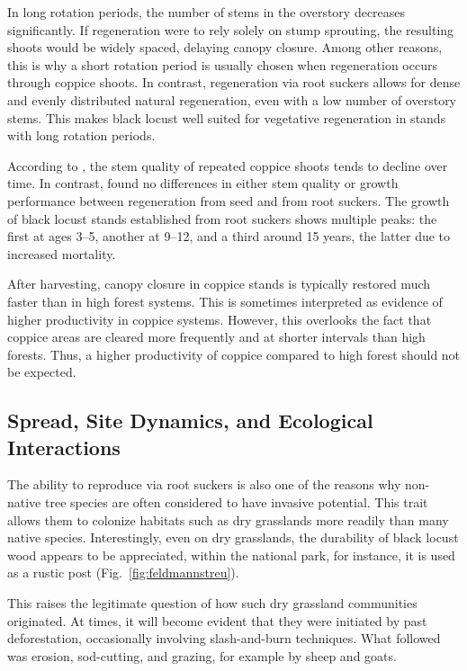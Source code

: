 In long rotation periods, the number of stems in the overstory decreases significantly. If regeneration were to rely solely on stump sprouting, the resulting shoots would be widely spaced, delaying canopy closure. Among other reasons, this is why a short rotation period is usually chosen when regeneration occurs through coppice shoots. In contrast, regeneration via root suckers allows for dense and evenly distributed natural regeneration, even with a low number of overstory stems. This makes black locust well suited for vegetative regeneration in stands with long rotation periods.

According to \citet{iski2019robinie}, the stem quality of repeated coppice shoots tends to decline over time. In contrast, \citet{redei2011robinieWaldbau} found no differences in either stem quality or growth performance between regeneration from seed and from root suckers. The growth of black locust stands established from root suckers shows multiple peaks: the first at ages 3–5, another at 9–12, and a third around 15 years, the latter due to increased mortality.

After harvesting, canopy closure in coppice stands is typically restored much faster than in high forest systems. This is sometimes interpreted as evidence of higher productivity in coppice systems. However, this overlooks the fact that coppice areas are cleared more frequently and at shorter intervals than high forests. Thus, a higher productivity of coppice compared to high forest should not be expected.

\subsection{Spread, Site Dynamics, and Ecological Interactions}

The ability to reproduce via root suckers is also one of the reasons why non-native tree species are often considered to have invasive potential. This trait allows them to colonize habitats such as dry grasslands more readily than many native species. Interestingly, even on dry grasslands, the durability of black locust wood appears to be appreciated, within the national park, for instance, it is used as a rustic post (Fig.~\ref{fig:feldmannstreu}).

This raises the legitimate question of how such dry grassland communities originated. At times, it will become evident that they were initiated by past deforestation, occasionally involving slash-and-burn techniques. What followed was erosion, sod-cutting, and grazing, for example by sheep and goats.

